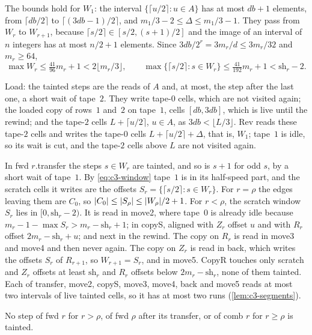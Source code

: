 \begin{informalproof}
The bounds hold for $W_1$: the interval $\{\lceil u/2\rceil:u\in A\}$ has at most $db+1$ elements, from $\lceil db/2\rceil$ to
$\lceil(3db-1)/2\rceil$, and $m_1/3-2\le\Delta\le m_1/3-1$. They pass from $W_r$ to $W_{r+1}$, because $\lceil s/2\rceil\in[s/2,(s+1)/2]$
and the image of an interval of $n$ integers has at most $n/2+1$ elements. Since $3db/2^r=3m_r/d\le3m_r/32$ and $m_r\ge64$,
\begin{equation}\label{eq:c3-window}
  \max W_r\le\tfrac{41}{96}m_r+1<2\lfloor m_r/3\rfloor,\qquad \max\{\lceil s/2\rceil:s\in W_r\}\le\tfrac{41}{192}m_r+1<\mathrm{sh}_r-2 .
\end{equation}

Load: the tainted steps are the reads of $A$ and, at most, the step after the last one, a short wait of tape~$2$. They write tape-$0$
cells, which are not visited again; the loaded copy of rows~$1$ and~$2$ on tape~$1$, cells $[db,3db]$, which is live until the rewind;
and the tape-$2$ cells $L+\lceil u/2\rceil$, $u\in A$, as $3db<\lfloor L/3\rfloor$. Rev reads these tape-$2$ cells and writes the tape-$0$
cells $L+\lceil u/2\rceil+\Delta$, that is, $W_1$; tape~$1$ is idle, so its wait is cut, and the tape-$2$ cells above $L$ are not
visited again.

In fwd $r$.transfer the steps $s\in W_r$ are tainted, and so is $s+1$ for odd $s$, by a short wait of tape~$1$. By \eqref{eq:c3-window}
tape~$1$ is in its half-speed part, and the scratch cells it writes are the offsets $S_r=\{\lceil s/2\rceil:s\in W_r\}$. For $r=\rho$ the
edges leaving them are $C_0$, so $\lvert C_0 \rvert\le\lvert S_\rho \rvert\le\lvert W_\rho \rvert/2+1$. For $r<\rho$, the scratch window $S_r$ lies in
$[0,\mathrm{sh}_r-2)$. It is read in move2, where tape~$0$ is already idle because $m_r-1-\max S_r>m_r-\mathrm{sh}_r+1$; in copyS, aligned
with $Z_r$ offset $u$ and with $R_r$ offset $2m_r-\mathrm{sh}_r+u$; and next in the rewind. The copy on $R_r$ is read in move3 and move4
and then never again. The copy on $Z_r$ is read in back, which writes the offsets $S_r$ of $R_{r+1}$, so $W_{r+1}=S_r$, and in move5.
CopyR touches only scratch and $Z_r$ offsets at least $\mathrm{sh}_r$ and $R_r$ offsets below $2m_r-\mathrm{sh}_r$, none of them tainted.
Each of transfer, move2, copyS, move3, move4, back and move5 reads at most two intervals of live tainted cells, so it has at most two
runs (\cref{lem:c3-segments}).
\end{informalproof}

\begin{lemma}\label{lem:c3-middle}
\notformalized
No step of fwd $r$ for $r>\rho$, of fwd $\rho$ after its transfer, or of comb $r$ for $r\ge\rho$ is tainted.
\end{lemma}

